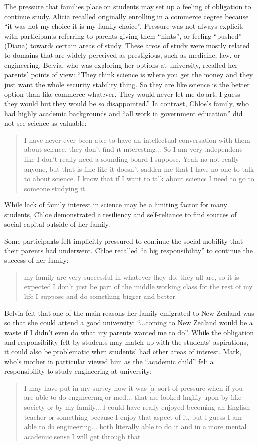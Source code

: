 The pressure that families place on students may set up a feeling of obligation to continue study. Alicia recalled originally enrolling in a commerce degree because ``it was not my choice it is my family choice''. Pressure was not always explicit, with participants referring to parents giving them ``hints'', or feeling ``pushed'' (Diana) towards certain areas of study. These areas of study were mostly related to domains that are widely perceived as prestigious, such as medicine, law, or engineering. Belvia, who was exploring her options at university, recalled her parents' points of view: ``They think science is where you get the money and they just want the whole security stability thing. So they are like science is the better option than like commerce whatever. They would never let me do art, I guess they would but they would be so disappointed.'' In contrast, Chloe's family, who had highly academic backgrounds and ``all work in government education'' did not see science as valuable: \blockquote{I have never ever been able to have an intellectual conversation with them about science, they don't find it interesting... So I am very independent like I don’t really need a sounding board I suppose. Yeah no not really anyone, but that is fine like it doesn't sadden me that I have no one to talk to about science. I know that if I want to talk about science I need to go to someone studying it.} While lack of family interest in science may be a limiting factor for many students, Chloe  demonstrated a resiliency and self-reliance to find sources of social capital outside of her family.

Some participants felt implicitly pressured to continue the social mobility that their parents had underwent. Chloe recalled ``a big responsibility'' to continue the success of her family: \blockquote{my family are very successful in whatever they do, they all are, so it is expected I don't just be part of the middle working class for the rest of my life I suppose and do something bigger and better}. Belvia felt that one of the main reasons her family emigrated to New Zealand was so that she could attend a good university: ``...coming to New Zealand would be a waste if I didn't even do what my parents wanted me to do''. While the obligation and responsibility felt by students may match up with the students' aspirations, it could also be problematic when students' had other areas of interest. Mark, who's mother in particular viewed him as the ``academic child'' felt a responsibility to study engineering at university: \blockquote{I may have put in my survey how it was [a] sort of pressure when if you are able to do engineering or med... that are looked highly upon by like society or by my family... I could have really enjoyed becoming an English teacher or something because I enjoy that aspect of it, but I guess I am able to do engineering... both literally able to do it and in a more mental academic sense I will get through that}. 

